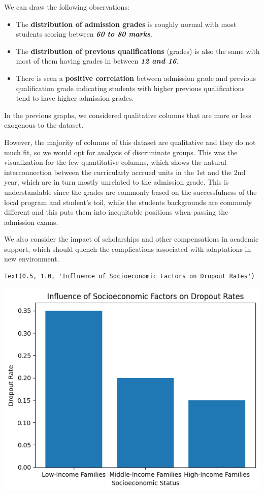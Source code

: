 \documentclass[
  letterpaper,
  DIV=11,
  numbers=noendperiod]{scrartcl}
\begin{document}
We can draw the following observations:

\begin{itemize}
\item
  The \textbf{distribution of admission grades} is roughly normal with
  most students scoring between \textbf{\emph{60 to 80 marks}}.
\item
  The \textbf{distribution of previous qualifications} (grades) is also
  the same with most of them having grades in between \textbf{\emph{12
  and 16}}.
\item
  There is seen a \textbf{positive correlation} between admission grade
  and previous qualification grade indicating students with higher
  previous qualifications tend to have higher admission grades.
\end{itemize}

In the previous graphs, we considered qualitative columns that are more
or less exogenous to the dataset.

However, the majority of columns of this dataset are qualitative and
they do not much fit, so we would opt for analysis of discriminate
groups. This was the visualization for the few quantitative columns,
which shows the natural interconnection between the curricularly accrued
units in the 1st and the 2nd year, which are in turn mostly unrelated to
the admission grade. This is understandable since the grades are
commonly based on the successfulness of the local program and student's
toil, while the students backgrounds are commonly different and this
puts them into inequitable positions when passing the admission exams.

We also consider the impact of scholarships and other compensations in
academic support, which should quench the complications associated with
adaptations in new environment.

\begin{verbatim}
Text(0.5, 1.0, 'Influence of Socioeconomic Factors on Dropout Rates')
\end{verbatim}

\includegraphics{report_AzadhdhinNedalYunisAlFraijat_files/figure-pdf/cell-22-output-2.png}
\end{document}
